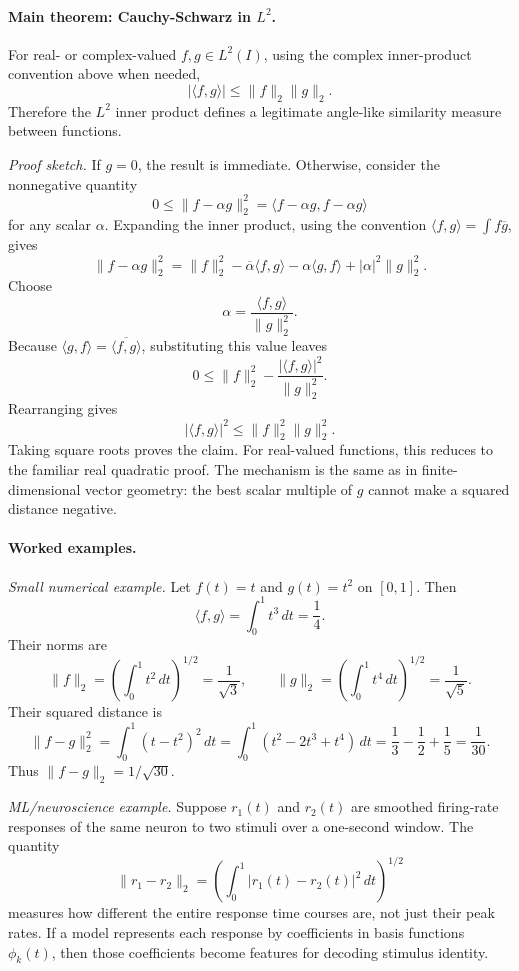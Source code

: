 \paragraph{Main theorem: Cauchy-Schwarz in \(L^2\).}
For real- or complex-valued \(f,g\in L^2(I)\), using the complex inner-product convention above when needed,
\[
|\langle f,g\rangle|
\leq
\|f\|_2\|g\|_2.
\]
Therefore the \(L^2\) inner product defines a legitimate angle-like similarity measure between functions.

\emph{Proof sketch.}
If \(g=0\), the result is immediate. Otherwise, consider the nonnegative quantity
\[
0\leq \|f-\alpha g\|_2^2
=\langle f-\alpha g,f-\alpha g\rangle
\]
for any scalar \(\alpha\). Expanding the inner product, using the convention \(\langle f,g\rangle=\int f\overline{g}\), gives
\[
\|f-\alpha g\|_2^2
=\|f\|_2^2-\overline{\alpha}\langle f,g\rangle-\alpha\langle g,f\rangle+|\alpha|^2\|g\|_2^2.
\]
Choose
\[
\alpha=\frac{\langle f,g\rangle}{\|g\|_2^2}.
\]
Because \(\langle g,f\rangle=\overline{\langle f,g\rangle}\), substituting this value leaves
\[
0\leq \|f\|_2^2-\frac{|\langle f,g\rangle|^2}{\|g\|_2^2}.
\]
Rearranging gives
\[
|\langle f,g\rangle|^2\leq \|f\|_2^2\|g\|_2^2.
\]
Taking square roots proves the claim. For real-valued functions, this reduces to the familiar real quadratic proof. The mechanism is the same as in finite-dimensional vector geometry: the best scalar multiple of \(g\) cannot make a squared distance negative.

\paragraph{Worked examples.}
\emph{Small numerical example.} Let \(f(t)=t\) and \(g(t)=t^2\) on \([0,1]\). Then
\[
\langle f,g\rangle
=\int_0^1 t^3\,dt
=\frac14.
\]
Their norms are
\[
\|f\|_2
=\left(\int_0^1 t^2\,dt\right)^{1/2}
=\frac{1}{\sqrt{3}},
\qquad
\|g\|_2
=\left(\int_0^1 t^4\,dt\right)^{1/2}
=\frac{1}{\sqrt{5}}.
\]
Their squared distance is
\[
\|f-g\|_2^2
=\int_0^1 (t-t^2)^2\,dt
=\int_0^1(t^2-2t^3+t^4)\,dt
=\frac13-\frac12+\frac15
=\frac{1}{30}.
\]
Thus \(\|f-g\|_2=1/\sqrt{30}\).

\emph{ML/neuroscience example.} Suppose \(r_1(t)\) and \(r_2(t)\) are smoothed firing-rate responses of the same neuron to two stimuli over a one-second window. The quantity
\[
\|r_1-r_2\|_2
=\left(\int_0^1 |r_1(t)-r_2(t)|^2\,dt\right)^{1/2}
\]
measures how different the entire response time courses are, not just their peak rates. If a model represents each response by coefficients in basis functions \(\phi_k(t)\), then those coefficients become features for decoding stimulus identity.

